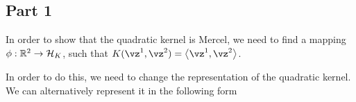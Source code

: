 \documentclass{article}
\begin{document}
\begin{mlsolution}
\end{mlsolution}

\begin{mlsolution}

	\subsection*{Part 1}
	\begin{addmargin}{1.5em}

		In order to show that the quadratic kernel is Mercel, we need to find a mapping $\phi: \mathbb{R}^2 \rightarrow \mathcal{H}_K$, such that $K(\vz^1, \vz^2) = \ip{\vz^1}{\vz^2}$. \br%

		In order to do this, we need to change the representation of the quadratic kernel. We can alternatively represent it in the following form


\end{addmargin}
\end{mlsolution}
\end{document}
